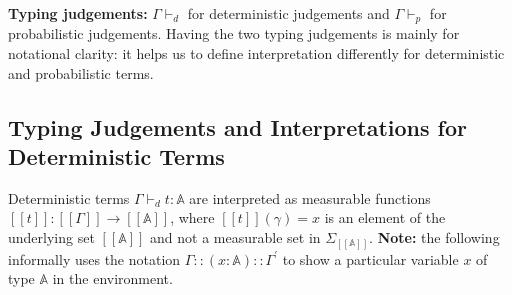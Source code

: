 \documentclass[11pt]{article}
\theoremstyle{definition}
\theoremstyle{plain}
\renewcommand{\b}[1]{\mathbb{#1}}
\begin{document}
\noindent \textbf{Typing judgements:} $\Gamma \vdash_d$ for deterministic
judgements and $\Gamma \vdash_p$ for probabilistic judgements. Having the two
typing judgements is mainly for notational clarity: it helps us to define 
interpretation differently for deterministic and probabilistic terms. \\


\subsection{Typing Judgements and Interpretations for Deterministic Terms}

\noindent Deterministic terms  $\Gamma \vdash_d t : \b{A}$ are interpreted
as measurable functions $[[t]]: [[\Gamma]] \rightarrow [[\b{A}]]$,
where $[[t]](\gamma) = x$ is an element of the underlying set
$[[\b{A}]]$ and not a measurable set in $\Sigma_{[[\b{A}]]}$.
\textbf{Note:} the following informally uses the notation 
$\Gamma::(x:\b{A})::\Gamma^\prime$ to show a particular variable $x$
of type $\b{A}$ in the environment.
\end{document}
